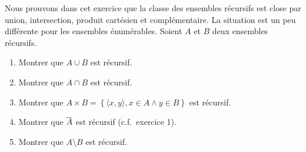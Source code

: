 \begin{td-exo} %
	Nous prouvons dans cet exercice que la classe des ensembles récursifs est close
	par union, intersection, produit cartésien et complémentaire.
	La situation est un peu différente pour les ensembles énumérables.
	Soient \(A\) et \(B\) deux ensembles récursifs.
	\begin{enumerate}
		\item Montrer que \(A\cup B\) est récursif.
		\item Montrer que \(A\cap B\) est récursif.
		\item Montrer que \(A\times B = \left\{\langle x,y\rangle, x\in A \wedge y\in B\right\}\) est récursif.
		\item Montrer que \(\overline{A}\) est récursif (c.f.\ exercice 1).
		\item Montrer que \(A \setminus B\) est récursif.
	\end{enumerate}
\end{td-exo}

